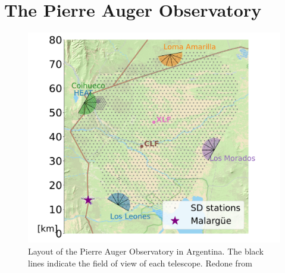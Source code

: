 
\chapter{The Pierre Auger Observatory}
\label{chap:setup}
\begin{figure}[h!]
\centering
\includegraphics[width=\textwidth]{thesis_figures/Setup/map_srij_version.pdf}
\caption{Layout of the Pierre Auger Observatory in Argentina. The black lines indicate the field of view of each telescope. Redone from~\cite{} }
\label{fig:Auger_map}
\end{figure}

